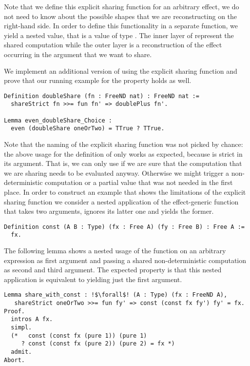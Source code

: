 Note that we define this explicit sharing function for an arbitrary effect, we do not need to know about the possible shapes that we are reconstructing on the right\--hand side.
In order to define this functionality in a separate function, we yield a nested value, that is a value of type .
The inner layer of  represent the shared computation while the outer layer is a reconstruction of the effect occurring in the argument  that we want to share.

We implement an additional version of  using the explicit sharing function and prove that our running example for the property holds as well.

\begin{verbatim}
Definition doubleShare (fn : FreeND nat) : FreeND nat :=
  shareStrict fn >>= fun fn' => doublePlus fn'.

Lemma even_doubleShare_Choice :
  even (doubleShare oneOrTwo) = TTrue ? TTrue.
\end{verbatim}

Note that the naming of the explicit sharing function was not picked by chance: the above usage for the definition of  only works as expected, because  is strict in its argument.
That is, we can only use  if we are sure that the computation that we are sharing needs to be evaluated anyway.
Otherwise we might trigger a non\--deterministic computation or a partial value that was not needed in the first place.
In order to construct an example that shows the limitations of the explicit sharing function we consider a nested application of the effect\--generic function  that takes two arguments, ignores its latter one and yields the former.

\begin{verbatim}
Definition const (A B : Type) (fx : Free A) (fy : Free B) : Free A :=
  fx.
\end{verbatim}

The following lemma shows a nested usage of the function  on an arbitrary expression as first argument and passing a shared non\--deterministic computation as second and third argument.
The expected property is that this nested application is equivalent to yielding just the first argument.

\begin{verbatim}
Lemma share_with_const : !$\forall$! (A : Type) (fx : FreeND A),
   shareStrict oneOrTwo >>= fun fy' => const (const fx fy') fy' = fx.
Proof.
  intros A fx.
  simpl.
  (*   const (const fx (pure 1)) (pure 1)
     ? const (const fx (pure 2)) (pure 2) = fx *)
  admit.
Abort.
\end{verbatim}

